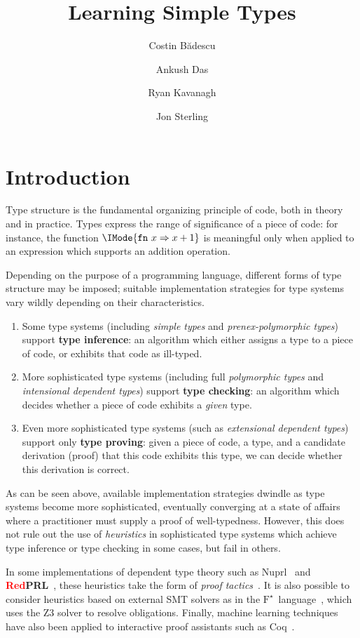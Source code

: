 \documentclass[twocolumn,9pt]{article}
\title{Learning Simple Types}
\author{Costin B\u{a}descu\and Ankush Das\and Ryan Kavanagh\and Jon Sterling}
\date{}
\theoremstyle{definition}
\theoremstyle{remark}
\numberwithin{equation}{section}
\newcommand\FStar{\ensuremath{\text{F}^\star}}
\newcommand\RedPRL{\textbf{\textcolor{red}{Red}PRL}}
\newcommand\Fn[2]{\mathtt{fn}\ {#1}\Rightarrow{#2}}
\begin{document}
\maketitle

\section{Introduction}

Type structure is the fundamental organizing principle of code, both
in theory and in practice. Types express the range of significance of
a piece of code: for instance, the function $\IMode{\Fn{x}{x+1}}$ is
meaningful only when applied to an expression which supports an
addition operation.

Depending on the purpose of a programming language, different forms of
type structure may be imposed; suitable implementation strategies for
type systems vary wildly depending on their characteristics.

\begin{enumerate}
\item Some type systems (including \emph{simple types} and
  \emph{prenex-polymorphic types}) support \textbf{type inference}: an
  algorithm which either assigns a type to a piece of code, or
  exhibits that code as ill-typed.
\item More sophisticated type systems (including full
  \emph{polymorphic types} and \emph{intensional dependent types})
  support \textbf{type checking}: an algorithm which decides whether a
  piece of code exhibits a \emph{given} type.
\item Even more sophisticated type systems (such as \emph{extensional
    dependent types}) support only \textbf{type proving}: given a
  piece of code, a type, and a candidate derivation (proof) that this
  code exhibits this type, we can decide whether this derivation is
  correct.
\end{enumerate}

As can be seen above, available implementation strategies dwindle as
type systems become more sophisticated, eventually converging at a
state of affairs where a practitioner must supply a proof of
well-typedness. However, this does not rule out the use of
\emph{heuristics} in sophisticated type systems which achieve type
inference or type checking in some cases, but fail in others.

In some implementations of dependent type theory such as
Nuprl~\cite{constable:1986} and \RedPRL{}~\cite{redprl:2016}, these
heuristics take the form of \emph{proof
  tactics}~\cite{gordon-milner-wadsworth:1979,paulson:1987,gordon:2000}. It
is also possible to consider heuristics based on external SMT solvers
as in the \FStar{}~language~\cite{ahman-et-al:2017}, which uses the Z3
solver to resolve obligations. Finally, machine learning techniques
have also been applied to interactive proof assistants such as
Coq~\cite{komendantskaya-heras-grov:2012}.
\end{document}
